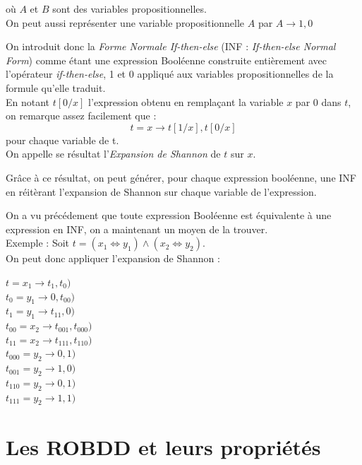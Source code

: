 \documentclass[a4paper, oneside]{report}
\begin{document}
où $A$ et $B$ sont des variables propositionnelles.\\

On peut aussi représenter une variable propositionnelle $A$ par $A \rightarrow 1, 0$

On introduit donc la \textit{Forme Normale If-then-else} (INF : \textit{If-then-else Normal Form}) comme étant une expression Booléenne construite entièrement avec l'opérateur \textit{if-then-else}, 1 et 0 appliqué aux variables propositionnelles de la formule qu'elle traduit.\\

En notant $t[0/x]$ l'expression obtenu en remplaçant la variable $x$ par $0$ dans $t$, on remarque assez facilement que :
$$ t = x \rightarrow t[1/x], t[0/x] $$ pour chaque variable de t.\\
On appelle se résultat l'\textit{Expansion de Shannon} de $t$ sur $x$.

Grâce à ce résultat, on peut générer, pour chaque expression booléenne, une INF en réitèrant l'expansion de Shannon sur chaque variable de l'expression.

On a vu précédement que toute expression Booléenne est équivalente à une expression en INF, on a maintenant un moyen de la trouver.\\

Exemple : Soit $t = ( x_1 \Leftrightarrow y_1 ) \wedge ( x_2 \Leftrightarrow y_2 )$.\\
On peut donc appliquer l'expansion de Shannon :
\begin{center}
$t = x_1 \rightarrow t_1, t_0)$\\
$t_0 = y_1 \rightarrow 0, t_{00})$\\
$t_1 = y_1 \rightarrow t_{11}, 0)$\\
$t_{00} = x_2 \rightarrow t_{001}, t_{000})$\\
$t_{11} = x_2 \rightarrow t_{111}, t_{110})$\\
$t_{000} = y_2 \rightarrow 0, 1)$\\
$t_{001} = y_2 \rightarrow 1, 0)$\\
$t_{110} = y_2 \rightarrow 0, 1)$\\
$t_{111} = y_2 \rightarrow 1, 1)$\\
\end{center}

\section{Les ROBDD et leurs propriétés}
\end{document}
